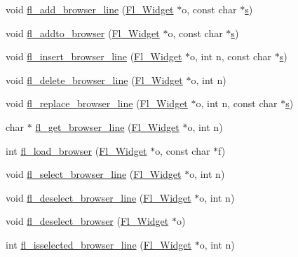 \begin{DoxyCompactItemize}
\item 
void \hyperlink{forms_8_h_aeb73d9f8de403b97bc08ea734374fb65}{fl\+\_\+add\+\_\+browser\+\_\+line} (\hyperlink{class_fl___widget}{Fl\+\_\+\+Widget} $\ast$o, const char $\ast$\hyperlink{forms_8_h_a672b4f0a8c8a6db61068c721f799d87f}{s})
\item 
void \hyperlink{forms_8_h_a18f45e842f0eef0f8a762d18fbee5b7e}{fl\+\_\+addto\+\_\+browser} (\hyperlink{class_fl___widget}{Fl\+\_\+\+Widget} $\ast$o, const char $\ast$\hyperlink{forms_8_h_a672b4f0a8c8a6db61068c721f799d87f}{s})
\item 
void \hyperlink{forms_8_h_a741a27b6f9f7f79f780904140c1cfa30}{fl\+\_\+insert\+\_\+browser\+\_\+line} (\hyperlink{class_fl___widget}{Fl\+\_\+\+Widget} $\ast$o, int n, const char $\ast$\hyperlink{forms_8_h_a672b4f0a8c8a6db61068c721f799d87f}{s})
\item 
void \hyperlink{forms_8_h_a91b6d73927e908fc8813bc4606070e24}{fl\+\_\+delete\+\_\+browser\+\_\+line} (\hyperlink{class_fl___widget}{Fl\+\_\+\+Widget} $\ast$o, int n)
\item 
void \hyperlink{forms_8_h_a20f9b808258afc681e159c0fb21a965b}{fl\+\_\+replace\+\_\+browser\+\_\+line} (\hyperlink{class_fl___widget}{Fl\+\_\+\+Widget} $\ast$o, int n, const char $\ast$\hyperlink{forms_8_h_a672b4f0a8c8a6db61068c721f799d87f}{s})
\item 
char $\ast$ \hyperlink{forms_8_h_a8f6a9d10c4b0033c7369106a378bfdc6}{fl\+\_\+get\+\_\+browser\+\_\+line} (\hyperlink{class_fl___widget}{Fl\+\_\+\+Widget} $\ast$o, int n)
\item 
int \hyperlink{forms_8_h_a6923a3c99fa745654d7ff5f7fd18a2ed}{fl\+\_\+load\+\_\+browser} (\hyperlink{class_fl___widget}{Fl\+\_\+\+Widget} $\ast$o, const char $\ast$f)
\item 
void \hyperlink{forms_8_h_a97b7b69f08703530f9e6b8380b21ca99}{fl\+\_\+select\+\_\+browser\+\_\+line} (\hyperlink{class_fl___widget}{Fl\+\_\+\+Widget} $\ast$o, int n)
\item 
void \hyperlink{forms_8_h_aa0e93f9fd96e44dd783f75eebfdd3c59}{fl\+\_\+deselect\+\_\+browser\+\_\+line} (\hyperlink{class_fl___widget}{Fl\+\_\+\+Widget} $\ast$o, int n)
\item 
void \hyperlink{forms_8_h_a120b109edd8338165d1f036e545621f6}{fl\+\_\+deselect\+\_\+browser} (\hyperlink{class_fl___widget}{Fl\+\_\+\+Widget} $\ast$o)
\item 
int \hyperlink{forms_8_h_a8468738bd3b5825e8da3157bd354bed1}{fl\+\_\+isselected\+\_\+browser\+\_\+line} (\hyperlink{class_fl___widget}{Fl\+\_\+\+Widget} $\ast$o, int n)

\end{DoxyCompactItemize}
